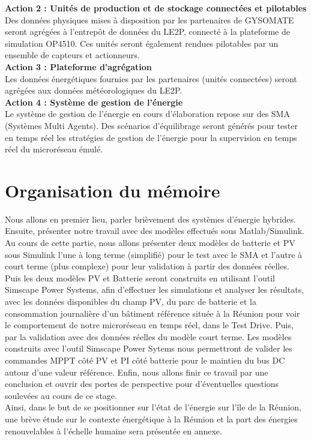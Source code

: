 \textbf{Action 2 : Unités de production et de stockage connectées et pilotables}\\
Des données physiques mises à disposition par les partenaires de GYSOMATE seront agrégées à l'entrepôt de données du LE2P, connecté à la plateforme de simulation OP4510. Ces unités seront également rendues pilotables par un ensemble de capteurs et actionneurs.\\
\textbf{Action 3 : Plateforme d’agrégation}\\ 
Les données énergétiques fournies par les partenaires (unités connectées) seront agrégées aux données météorologiques du LE2P.\\
\textbf{Action 4 : Système de gestion de l’énergie}\\ 
Le système de gestion de l’énergie en cours d'élaboration repose sur des SMA (Systèmes Multi Agents). Des scénarios d’équilibrage seront générés pour tester en temps réel les stratégies de gestion de l’énergie pour la supervision en temps réel du microréseau émulé.


\section*{Organisation du mémoire} Nous allons en premier lieu, parler brièvement des systèmes d'énergie hybrides. Ensuite, présenter notre travail avec des modèles effectués sous Matlab/Simulink. Au cours de cette partie, nous allons présenter deux modèles de batterie et PV sous Simulink l'une à long terme (simplifié) pour le test avec le SMA et l'autre à court terme (plus complexe) pour leur validation à partir des données réelles. Puis les deux modèles PV et Batterie seront construits en utilisant l'outil Simscape Power Systems, afin d'effectuer les simulations et analyser les résultats, avec les données disponibles du champ PV, du parc de batterie et la  consommation journalière d'un bâtiment référence située à la Réunion pour voir le comportement de notre microréseau en temps réel, dans le Test Drive. Puis, par la validation avec des données réelles du modèle court terme. Les modèles construits avec l'outil Simscape Power Sytems nous permettront de valider les commandes MPPT côté PV et PI côté batterie pour le maintien du bus DC autour d'une valeur référence. Enfin, nous allons finir ce travail par une conclusion et ouvrir des portes de perspective pour d'éventuelles questions soulevées au cours de ce stage.\\ Ainsi, dans le but de se positionner sur l'état de l'énergie sur l'île de la Réunion, une brève étude sur le contexte énergétique à la Réunion et la part des énergies renouvelables à l'échelle humaine sera présentée en annexe.
